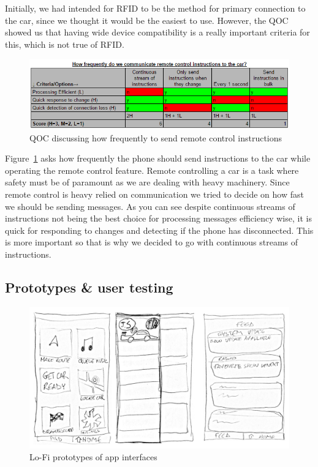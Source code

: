 \documentclass{article}
\begin{document}
Initially, we had intended for RFID to be the method for primary connection to the car, since we thought it would be the easiest to use. However, the QOC showed us that having wide device compatibility is a really important criteria for this, which is not true of RFID.

\begin{figure}[H]
  \centering
  \includegraphics[scale=0.8]{qoc-app-remote}
  \caption{QOC discussing how frequently to send remote control instructions}\label{qoc-app-remote}
\end{figure}

Figure~\ref{qoc-app-remote} asks how frequently the phone should send instructions to the car while operating the remote control feature. Remote controlling a car is a task where safety must be of paramount as we are dealing with heavy machinery. Since remote control is heavy relied on communication we tried to decide on how fast we should be sending messages. As you can see despite continuous streams of instructions  not being the best choice for processing messages efficiency wise, it is quick for responding to changes and detecting if the phone has disconnected. This is more important so that is why we decided to go with continuous streams of instructions.

\subsection{Prototypes \& user testing}\label{ssec:app-prototypes-testing}
\begin{figure}[H]
  \centering
  \includegraphics[width=\textwidth]{app-lofi}
  \caption{Lo-Fi prototypes of app interfaces}\label{figure-app-lofi}
\end{figure}
\end{document}
